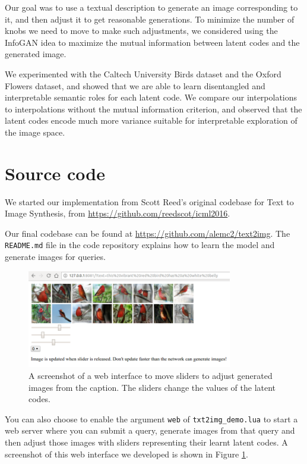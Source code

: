 \documentclass{article}
\begin{document}
Our goal was to use a textual description to generate an image corresponding to it, and then adjust it to get reasonable generations. To minimize the number of knobs we need to move to make such adjustments, we considered using the InfoGAN idea to maximize the mutual information between latent codes and the generated image.

We experimented with the Caltech University Birds dataset and the Oxford Flowers dataset, and showed that we are able to learn disentangled and interpretable semantic roles for each latent code. We compare our interpolations to interpolations without the mutual information criterion, and observed that the latent codes encode much more variance suitable for interpretable exploration of the image space.



\section*{Source code}

We started our implementation from Scott Reed's original codebase for Text to Image Synthesis, from \url{https://github.com/reedscot/icml2016}.

Our final codebase can be found at \url{https://github.com/alemc2/text2img}. The \texttt{README.md} file in the code repository explains how to learn the model and generate images for queries.

\begin{figure}
    \centering
    \includegraphics[width=0.8\textwidth]{web}
    \caption{A screenshot of a web interface to move sliders to adjust generated images from the caption. The sliders change the values of the latent codes.}
    \label{fig:web}
\end{figure}

You can also choose to enable the argument \texttt{web} of \texttt{txt2img\_demo.lua} to start a web server where you can submit a query, generate images from that query and then adjust those images with sliders representing their learnt latent codes. A screenshot of this web interface we developed is shown in Figure \ref{fig:web}.


\small

\end{document}
